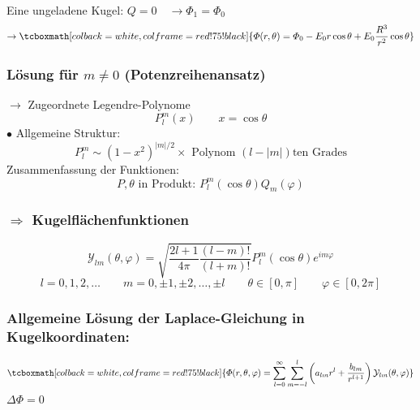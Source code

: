 \documentclass[titlepage,11pt,a4paper,ngerman]{report}
\renewcommand{\Phi}{\varPhi}
\renewcommand{\vec}[1]{\boldsymbol{#1}}
\newcommand{\rmbox}[1]{\tcboxmath[colback=white,colframe=red!75!black]{#1}}
\begin{document}
\begin{minipage}{.3\linewidth}
	\centering
\end{minipage}%
\\
Eine ungeladene Kugel: $ Q = 0 \quad \rightarrow \Phi_1 = \Phi_0 $
\begin{equation*}
\rightarrow \rmbox{\Phi(r,\theta) = \Phi_0 - E_0 r \cos\theta + E_0 \frac{R^3}{r^2} \cos \theta}
\end{equation*}

\subsubsection{Lösung für $ m \neq 0 $ (Potenzreihenansatz)}

$\rightarrow$ Zugeordnete Legendre-Polynome
$$P^m_l (x) \qquad x = \cos\theta$$
$\bullet$ Allgemeine Struktur:
$$P_l^m \sim (1-x^2)^{|m|/2} \times \textrm{ Polynom } (l-|m|)\textrm{ten Grades}$$
Zusammenfassung der Funktionen:
$$ P, \theta \textrm{ in Produkt: } P_l^m (\cos\theta) Q_m (\varphi)$$
\subsubsection{$\Rightarrow$ Kugelflächenfunktionen}
$$\mathcal Y_{lm} (\theta,\varphi) = \sqrt{\frac{2l+1}{4\pi}\frac{(l-m)!}{(l+m)!}} P_l^m (\cos\theta)e^{im\varphi}$$
$$l = 0,1,2,\dots \qquad m = 0,\pm 1,\pm 2,\dots,\pm l \qquad \theta \in [0,\pi] \qquad \varphi \in [0,2\pi]$$


\subsubsection{Allgemeine Lösung der Laplace-Gleichung in Kugelkoordinaten:}

\begin{equation*}
\rmbox{\Phi(r,\theta,\varphi) = \sum_{l=0}^{\infty} \sum_{m=-l}^{l} \left(a_{lm} r^l + \frac{b_{lm}}{r^{l+1}}\right) \mathcal{Y}_{lm} (\theta,\varphi)}
\end{equation*}
$ \Delta \Phi = 0 $
\end{document}
